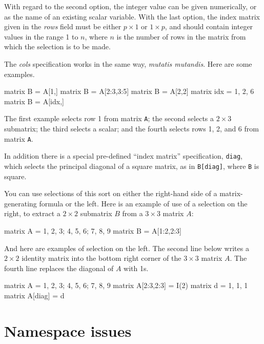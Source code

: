 With regard to the second option, the integer value can be given
numerically, or as the name of an existing scalar variable.  With the
last option, the index matrix given in the \textsl{rows} field must be
either $p\times 1$ or $1\times p$, and should contain integer values
in the range 1 to $n$, where $n$ is the number of rows in the matrix
from which the selection is to be made.

The \textsl{cols} specification works in the same way, \textit{mutatis
  mutandis}.  Here are some examples.
%
\begin{code}
matrix B = A[1,]
matrix B = A[2:3,3:5]
matrix B = A[2,2]
matrix idx = { 1, 2, 6 }
matrix B = A[idx,]
\end{code}
%
The first example selects row 1 from matrix \texttt{A}; the second
selects a $2\times 3$ submatrix; the third selects a scalar; and
the fourth selects rows 1, 2, and 6 from matrix \texttt{A}.

In addition there is a special pre-defined ``index matrix''
specification, \texttt{diag}, which selects the principal diagonal of
a square matrix, as in \texttt{B[diag]}, where \texttt{B} is square.

You can use selections of this sort on either the right-hand side of
a matrix-generating formula or the left.  Here is an example of use of
a selection on the right, to extract a $2\times 2$ submatrix $B$ from a
$3\times 3$ matrix $A$:
%
\begin{code}
matrix A = { 1, 2, 3; 4, 5, 6; 7, 8, 9 }
matrix B = A[1:2,2:3]
\end{code}
%
And here are examples of selection on the left.  The second line below
writes a $2\times 2$ identity matrix into the bottom right corner of the
$3\times 3$ matrix $A$.  The fourth line replaces the diagonal of $A$ 
with 1s.
%
\begin{code}
matrix A = { 1, 2, 3; 4, 5, 6; 7, 8, 9 }
matrix A[2:3,2:3] = I(2)
matrix d = { 1, 1, 1 }
matrix A[diag] = d
\end{code}

\section{Namespace issues}
\label{matrix-namespace}

